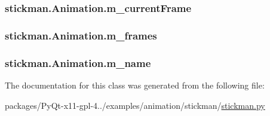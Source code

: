 \subsubsection[{m\+\_\+current\+Frame}]{\setlength{\rightskip}{0pt plus 5cm}stickman.\+Animation.\+m\+\_\+current\+Frame}\label{classstickman_1_1Animation_a3b9877cbb27f5e83ba7eb6b367f5558d}
\hypertarget{classstickman_1_1Animation_a961f026247cca7541d590029a60ae2b8}{}
\subsubsection[{m\+\_\+frames}]{\setlength{\rightskip}{0pt plus 5cm}stickman.\+Animation.\+m\+\_\+frames}\label{classstickman_1_1Animation_a961f026247cca7541d590029a60ae2b8}
\hypertarget{classstickman_1_1Animation_a4422aef88cf77286af7eda3aeff2febb}{}
\subsubsection[{m\+\_\+name}]{\setlength{\rightskip}{0pt plus 5cm}stickman.\+Animation.\+m\+\_\+name}\label{classstickman_1_1Animation_a4422aef88cf77286af7eda3aeff2febb}


The documentation for this class was generated from the following file\+:\begin{DoxyCompactItemize}
\item 
packages/\+Py\+Qt-\/x11-\/gpl-\/4../examples/animation/stickman/\hyperlink{stickman_8py}{stickman.\+py}\end{DoxyCompactItemize}
